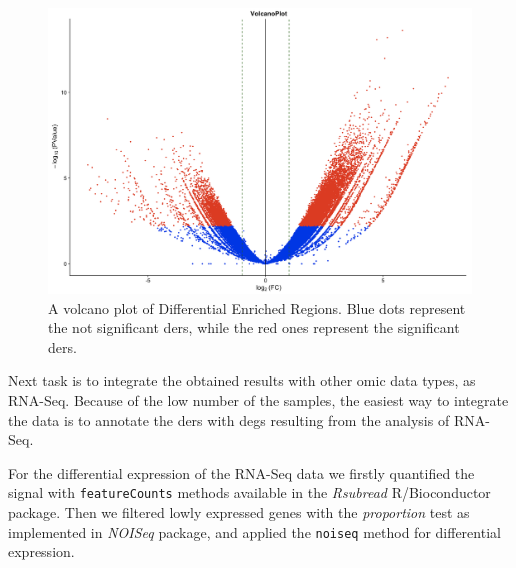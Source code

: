 \begin{figure}[H]
\centering
\includegraphics[width=\textwidth, height=\textheight, keepaspectratio]{img/descan2/DE_peaks.png}
\caption[Differential Enrichment Regions Volcano]{A volcano plot of Differential Enriched Regions. Blue dots represent the not significant \glspl{der}, while the red ones represent the significant \glspl{der}.}
\label{fig:depeaksdescan}
\centering
\end{figure}

Next task is to integrate the obtained results with other omic data types, as RNA-Seq. 
Because of the low number of the samples, the easiest way to integrate the data is to annotate the \glspl{der} with \glspl{deg} resulting from the analysis of RNA-Seq.

For the differential expression of the RNA-Seq data we firstly quantified the signal with \lstinline!featureCounts! methods available in the \textit{Rsubread} \cite{Liao2013} R/Bioconductor package.
Then we filtered lowly expressed genes with the \textit{proportion} test  as implemented in \textit{NOISeq} package, and applied the \lstinline!noiseq! method for differential expression.

